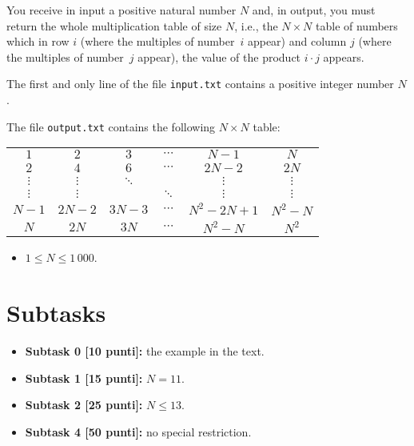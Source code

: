 \renewcommand{\nomebreve}{for2\_file}
\renewcommand{\titolo}{nested for - computing multiplication tables}

\introduzione{}

You receive in input a positive natural number $N$ and,
in output, you must return the whole multiplication table of size $N$,
i.e., the $N\times N$ table of numbers which
in row $i$ (where the multiples of number~$i$ appear)
and column $j$  (where the multiples of number~$j$ appear),
the value of the product $i\cdot j$ appears.

The first and only line of the file \verb'input.txt'
contains a positive integer number $N$.


The file \verb'output.txt' contains the following $N\times N$ table:\\

\begin{tabular}{cccccc}
    $1$   &   $2$    &  $3$     & $\cdots$ &  $N-1$     &  $N$ \\
    $2$   &   $4$    &  $6$     & $\cdots$ & $2N-2$     & $2N$ \\
 $\vdots$ & $\vdots$ & $\ddots$ &          &   $\vdots$ &  $\vdots$ \\
 $\vdots$ & $\vdots$ &          & $\ddots$ &   $\vdots$ &  $\vdots$ \\
  $N-1$   & $2N-2$   & $3N-3$   & $\cdots$ & $N^2-2N+1$ & $N^2-N$ \\
    $N$   &  $2N$    & $3N$     & $\cdots$ &    $N^2-N$ &  $N^2$
\end{tabular}


\begin{itemize}[nolistsep, noitemsep]
  \item $1 \le N \le 1\,000$.
\end{itemize}
  
  \section*{Subtasks}
  \begin{itemize}
    \item \textbf{Subtask 0 [10 punti]:} the example in the text.
    \item \textbf{Subtask 1 [15 punti]:} $N = 11$.
    \item \textbf{Subtask 2 [25 punti]:} $N \leq 13$.
    \item \textbf{Subtask 4 [50 punti]:} no special restriction.
  \end{itemize}
  
